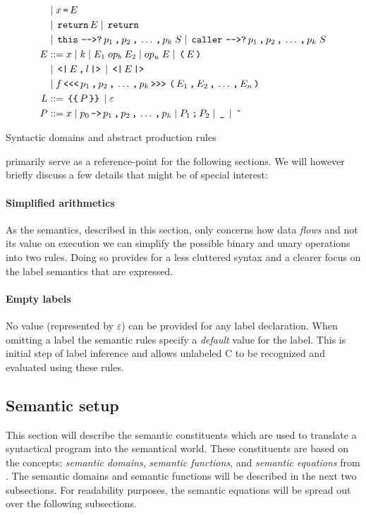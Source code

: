 \begin{table}[p]
\begin{align*}
              & \gp x \tk = E \\
              & \gp \tk{return} E \gp \tk{return} \\
              & \gp \tk{this} \tk{-{}->?} p_1 \tk , p_2 \tk , \dots \tk , p_k \; S \gp \tk{caller} \tk{-{}->?} p_1 \tk , p_2 \tk , \dots \tk , p_k \; S \\
    E         & ::= x \gp k \gp E_1 \; op_b \; E_2 \gp op_u \; E \gp \tk ( E \tk ) \\
              & \gp \tk{<|} E \tk , l \tk{|>} \gp \tk{<|} E \tk{|>} \\
              & \gp f \tk{<{}<{}<} p_1 \tk , p_2 \tk , \dots \tk , p_k \tk{>{}>{}>} \tk ( E_1 \tk , E_2 \tk , \dots \tk , E_n \tk ) \\
    L         & ::= \tk{\{\{} P \tk{\}\}} \gp \varepsilon \\
    P         & ::= x \gp p_0 \tk{->} p_1 \tk , p_2 \tk , \dots \tk , p_k \gp P_1 \tk ; P_2 \gp \tk \_ \gp \tk{\^{}}
  \end{align*}
  \caption{Syntactic domains and abstract production rules}
  \label{ctif:rules}
\end{table}

 primarily serve as a reference-point for the following sections.
We will however briefly discuss a few details that might be of special interest:

\paragraph{Simplified arithmetics}
As the semantics, described in this section, only concerns how data \textit{flows} and not its value on execution we can simplify the possible binary and unary operations into two rules.
Doing so provides for a less cluttered syntax and a clearer focus on the label semantics that are expressed.

\paragraph{Empty labels}
No value (represented by $\varepsilon$) can be provided for any label declaration.
When omitting a label the semantic rules specify a \textit{default} value for the label.
This is initial step of label inference and allows unlabeled C to be recognized and evaluated using these rules.

\subsection{Semantic setup}
This section will describe the semantic constituents which are used to translate a syntactical \thelang{} program into the semantical world.
These constituents are based on the concepts: \emph{semantic domains}, \emph{semantic functions}, and \emph{semantic equations} from \cite[Chapter 9]{slonneger1995formal}.
The semantic domains and semantic functions will be described in the next two subsections.
For readability purposes, the semantic equations will be spread out over the following subsections.

